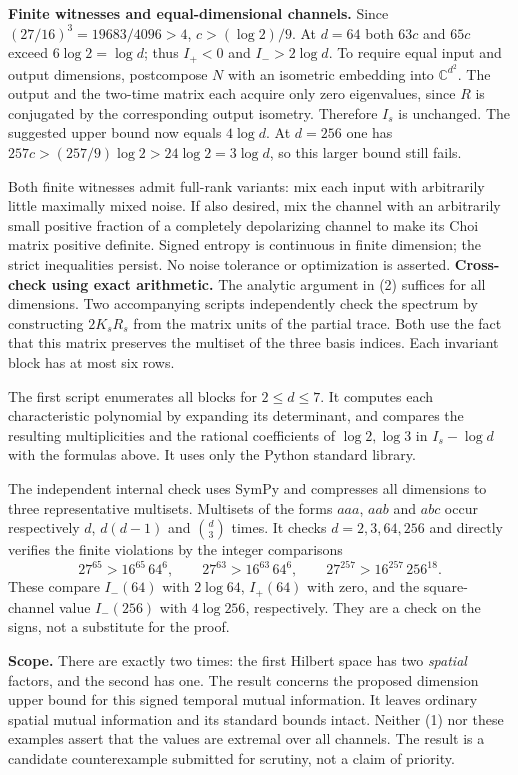 \documentclass[11pt]{article}
\begin{document}
\textbf{Finite witnesses and equal-dimensional channels.} Since $(27/16)^3=19683/4096>4$, $c>(\log2)/9$. At $d=64$ both $63c$ and $65c$ exceed $6\log2=\log d$; thus $I_+<0$ and $I_->2\log d$. To require equal input and output dimensions, postcompose $N$ with an isometric embedding into $\mathbb C^{d^2}$. The output and the two-time matrix each acquire only zero eigenvalues, since $R$ is conjugated by the corresponding output isometry. Therefore $I_s$ is unchanged. The suggested upper bound now equals $4\log d$. At $d=256$ one has $257c>(257/9)\log2>24\log2=3\log d$, so this larger bound still fails.

Both finite witnesses admit full-rank variants: mix each input with arbitrarily little maximally mixed noise. If also desired, mix the channel with an arbitrarily small positive fraction of a completely depolarizing channel to make its Choi matrix positive definite. Signed entropy is continuous in finite dimension; the strict inequalities persist. No noise tolerance or optimization is asserted.
\newpage
 \textbf{Cross-check using exact arithmetic.} The analytic argument in (2) suffices for all dimensions. Two accompanying scripts independently check the spectrum by constructing $2K_sR_s$ from the matrix units of the partial trace. Both use the fact that this matrix preserves the multiset of the three basis indices. Each invariant block has at most six rows.

The first script enumerates all blocks for $2\le d\le7$. It computes each characteristic polynomial by expanding its determinant, and compares the resulting multiplicities and the rational coefficients of $\log 2,\log 3$ in $I_s-\log d$ with the formulas above. It uses only the Python standard library.

The independent internal check uses SymPy and compresses all dimensions to three representative multisets. Multisets of the forms $aaa$, $aab$ and $abc$ occur respectively $d$, $d(d-1)$ and $\binom d3$ times. It checks $d=2,3,64,256$ and directly verifies the finite violations by the integer comparisons
\[
27^{65}>16^{65}\,64^6,\qquad 27^{63}>16^{63}\,64^6,\qquad 27^{257}>16^{257}\,256^{18}.
\]
These compare $I_-(64)$ with $2\log64$, $I_+(64)$ with zero, and the square-channel value $I_-(256)$ with $4\log256$, respectively. They are a check on the signs, not a substitute for the proof.

\textbf{Scope.} There are exactly two times: the first Hilbert space has two \emph{spatial} factors, and the second has one. The result concerns the proposed dimension upper bound for this signed temporal mutual information. It leaves ordinary spatial mutual information and its standard bounds intact. Neither (1) nor these examples assert that the values are extremal over all channels. The result is a candidate counterexample submitted for scrutiny, not a claim of priority.
\end{document}
